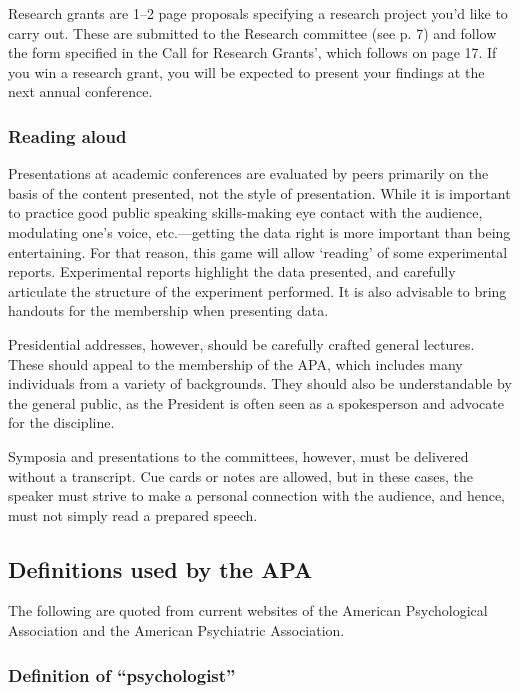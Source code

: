 Research grants are 1--2 page proposals specifying a research project you'd like to carry out. These are submitted to the Research committee (see p. 7) and follow the form specified in the Call for Research Grants', which follows on page 17. If you win a research grant, you will be expected to present your findings at the next annual conference.

\subsubsection{Reading aloud}
\label{readingaloud}

Presentations at academic conferences are evaluated by peers primarily on the basis of the content presented, not the style of presentation. While it is important to practice good public speaking skills-making eye contact with the audience, modulating one's voice, etc.—getting the data right is more important than being entertaining. For that reason, this game will allow `reading' of some experimental reports. Experimental reports highlight the data presented, and carefully articulate the structure of the experiment performed. It is also advisable to bring handouts for the membership when presenting data.

Presidential addresses, however, should be carefully crafted general lectures. These should appeal to the membership of the APA, which includes many individuals from a variety of backgrounds. They should also be understandable by the general public, as the President is often seen as a spokesperson and advocate for the discipline.

Symposia and presentations to the committees, however, must be delivered without a transcript. Cue cards or notes are allowed, but in these cases, the speaker must strive to make a personal connection with the audience, and hence, must not simply read a prepared speech.

\subsection{Definitions used by the APA}
\label{definitionsusedbytheapa}

The following are quoted from current websites of the American Psychological Association and the American Psychiatric Association.

\subsubsection{Definition of ``psychologist''}
\label{definitionofpsychologist}

